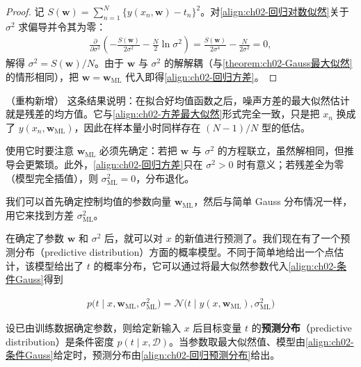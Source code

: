 \documentclass[../../main.tex]{subfiles}
\begin{document}
\begin{proof}
记 $S(\mathbf{w})=\sum_{n=1}^{N}\{y(x_n,\mathbf{w})-t_n\}^{2}$。对\eqref{align:ch02-回归对数似然}关于 $\sigma^{2}$ 求偏导并令其为零：
\begin{align*}
  \frac{\partial}{\partial\sigma^{2}}\left(-\frac{S(\mathbf{w})}{2\sigma^{2}}-\frac{N}{2}\ln\sigma^{2}\right)
  = \frac{S(\mathbf{w})}{2\sigma^{4}} - \frac{N}{2\sigma^{2}} = 0 ,
\end{align*}
解得 $\sigma^{2}=S(\mathbf{w})/N$。由于 $\mathbf{w}$ 与 $\sigma^{2}$ 的解解耦（与\cref{theorem:ch02-Gauss最大似然}的情形相同），把 $\mathbf{w}=\mathbf{w}_{\mathrm{ML}}$ 代入即得\eqref{align:ch02-回归方差}。
\end{proof}

\begin{remark}（重构新增）
这条结果说明：在拟合好均值函数之后，噪声方差的最大似然估计就是残差的均方值。它与\eqref{align:ch02-方差最大似然}形式完全一致，只是把 $x_n$ 换成了 $y(x_n,\mathbf{w}_{\mathrm{ML}})$，因此在样本量小时同样存在 $(N-1)/N$ 型的低估。

使用它时要注意 $\mathbf{w}_{\mathrm{ML}}$ 必须先确定：若把 $\mathbf{w}$ 与 $\sigma^{2}$ 的方程联立，虽然解相同，但推导会更繁琐。此外，\eqref{align:ch02-回归方差}只在 $\sigma^{2}>0$ 时有意义；若残差全为零（模型完全插值），则 $\sigma_{\mathrm{ML}}^{2}=0$，分布退化。
\end{remark}

我们可以首先确定控制均值的参数向量 $\mathbf{w}_{\mathrm{ML}}$，然后与简单 Gauss 分布情况一样，用它来找到方差 $\sigma_{\mathrm{ML}}^{2}$。

在确定了参数 $\mathbf{w}$ 和 $\sigma^{2}$ 后，就可以对 $x$ 的新值进行预测了。我们现在有了一个预测分布（predictive distribution）方面的概率模型。不同于简单地给出一个点估计，该模型给出了 $t$ 的概率分布，它可以通过将最大似然参数代入\eqref{align:ch02-条件Gauss}得到

\begin{align}
  p\big(t\mid x,\mathbf{w}_{\mathrm{ML}},\sigma_{\mathrm{ML}}^{2}\big) = \mathcal{N}\big(t\mid y(x,\mathbf{w}_{\mathrm{ML}}),\sigma_{\mathrm{ML}}^{2}\big)
  \label{align:ch02-回归预测分布}
\end{align}

\begin{definition}[预测分布]\label{definition:ch02-预测分布}
设已由训练数据确定参数，则给定新输入 $x$ 后目标变量 $t$ 的\textbf{预测分布}（predictive distribution）是条件密度 $p(t\mid x,\mathcal{D})$。当参数取最大似然值、模型由\eqref{align:ch02-条件Gauss}给定时，预测分布由\eqref{align:ch02-回归预测分布}给出。
\end{definition}
\end{document}
